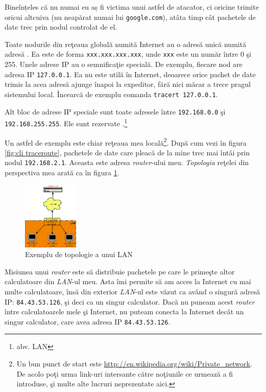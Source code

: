 Bineînțeles că nu numai eu aș fi
victima unui astfel de atacator, ci oricine trimite 
oricui altcuiva (nu neapărat numai lui \texttt{google.com}), atâta timp cât pachetele
de date trec prin nodul controlat de el.

Toate nodurile din reţeaua globală numită Internet au o adresă unică numită adresă
. Ea este de forma \texttt{xxx.xxx.xxx.xxx}, unde \texttt{xxx} este un număr
între 0 şi 255. Unele adrese IP au o semnificaţie specială. De exemplu, fiecare
nod are adresa IP \texttt{127.0.0.1}. Ea nu este utilă în Internet, deoarece orice pachet
de date trimis la acea adresă ajunge înapoi la expeditor, fără nici măcar a trece
pragul sistemului local. Încearcă de exemplu comanda \texttt{tracert 127.0.0.1}.

Alt bloc de adrese IP speciale sunt toate adresele între \texttt{192.168.0.0} şi
\texttt{192.168.255.255}. Ele sunt rezervate .\footnote{abv. LAN}

Un astfel de exemplu este chiar reţeaua mea
locală\footnote{Un bun punct de start este \url{http://en.wikipedia.org/wiki/Private_network}.
De acolo poţi urma link-uri intersante către noţiunile ce urmează a fi introduse,
şi multe alte lucruri neprezentate aici.}.
După cum vezi în figura \ref{fig:cli traceroute},
pachetele de date care pleacă de la mine trec mai întâi prin nodul \texttt{192.168.2.1}.
Aceasta este adresa \textsl{router}-ului meu. \textsl{Topologia} reţelei din perspectiva mea
arată ca în figura \ref{fig:topologie}.

\begin{figure}[h]
  \centering
    \includegraphics[width=100px]{cap01/Diagram1.png}
  \caption{Exemplu de topologie a unui LAN}
  \label{fig:topologie}
\end{figure}

Misiunea unui \textsl{router} este să distribuie pachetele
pe care le primeşte altor calculatoare din \textsl{LAN}-ul meu. Asta îmi permite să am acces
la Internet cu mai multe calculatoare, însă din exterior \textsl{LAN}-ul este văzut ca
având o singură adresă IP: \texttt{84.43.53.126}, şi deci ca un singur calculator. Dacă
nu puneam acest \textsl{router} între calculatoarele mele şi Internet, nu puteam conecta
la Internet decât un singur calculator, care avea adresa IP \texttt{84.43.53.126}.

